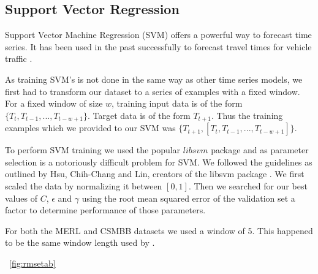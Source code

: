 \subsection{Support Vector Regression}
Support Vector Machine Regression (SVM) offers a powerful way to forecast time series.  It has been used in the past successfully to forecast travel times for vehicle traffic \cite{Wu2004}.  

As training SVM's is not done in the same way as other time series models, we first had to transform our dataset to a series of examples with a fixed window.  For a fixed window of size $w$, training input data is of the form $\{T_{t}, T_{t - 1}, ..., T_{t - w + 1}\}$.  Target data is of the form $T_{t + 1}$.  Thus the training examples which we provided to our SVM was $\{T_{t + 1}, [T_{t}, T_{t - 1}, ..., T_{t - w + 1}]\}$.

To perform SVM training we used the popular $libsvm$ package and as parameter selection is a notoriously difficult problem for SVM.  We followed the guidelines as outlined by Hsu, Chih-Chang and Lin, creators of the libsvm package \cite{Hsu2003}.  We first scaled the data by normalizing it between $[0, 1]$.  Then we searched for our best values of $C$, $\epsilon$ and $\gamma$ using the root mean squared error of the validation set a factor to determine performance of those parameters. 

For both the MERL and CSMBB datasets we used a window of 5.  This happened to be the same window length used by \cite{Wu2004}.

~\ref{fig:rmsetab}

